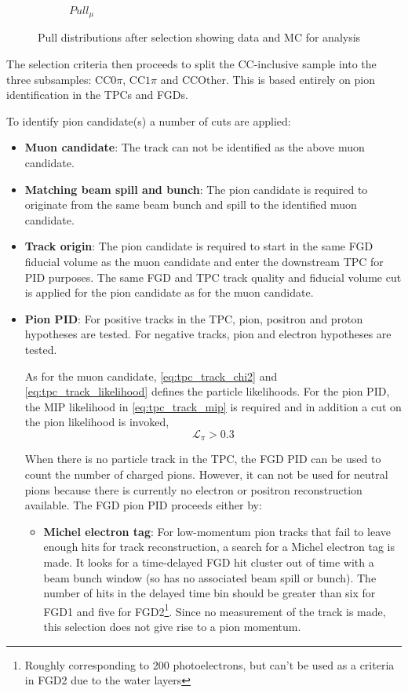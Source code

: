 \begin{figure}[!h]
\begin{subfigure}[t]{0.32\textwidth}
		\caption{$Pull_\mu$}
	\end{subfigure}
	\caption{Pull distributions after selection showing data and MC for \numu analysis}
	\label{fig:numu_pulls}
\end{figure}

The selection criteria then proceeds to split the CC-inclusive sample into the three subsamples: CC$0\pi$, CC$1\pi$ and CCOther. This is based entirely on pion identification in the TPCs and FGDs.

To identify pion candidate(s) a number of cuts are applied:
\begin{itemize}
	\item \textbf{Muon candidate}: The track can not be identified as the above muon candidate.
	
	\item \textbf{Matching beam spill and bunch}: The pion candidate is required to originate from the same beam bunch and spill to the identified muon candidate.
	
	\item \textbf{Track origin}: The pion candidate is required to start in the same FGD fiducial volume as the muon candidate and enter the downstream TPC for PID purposes. The same FGD and TPC track quality and fiducial volume cut is applied for the pion candidate as for the muon candidate.
	
	\item \textbf{Pion PID}: For positive tracks in the TPC, pion, positron and proton hypotheses are tested. For negative tracks, pion and electron hypotheses are tested. 
	
	As for the muon candidate, \autoref{eq:tpc_track_chi2} and \autoref{eq:tpc_track_likelihood} defines the particle likelihoods. For the pion PID, the MIP likelihood in \autoref{eq:tpc_track_mip} is required and in addition a cut on the pion likelihood is invoked,
	\begin{equation}
	\label{tpc_track_pi}
		\mathcal{L}_\pi > 0.3
	\end{equation}
	
	When there is no particle track in the TPC, the FGD PID can be used to count the number of charged pions. However, it can not be used for neutral pions because there is currently no electron or positron reconstruction available. The FGD pion PID proceeds either by:
	\begin{itemize}
		\item \textbf{Michel electron tag}: For low-momentum pion tracks that fail to leave enough hits for track reconstruction, a search for a Michel electron tag is made. It looks for a time-delayed FGD hit cluster out of time with a beam bunch window (so has no associated beam spill or bunch). The number of hits in the delayed time bin should be greater than six for FGD1 and five for FGD2\footnote{Roughly corresponding to 200 photoelectrons, but can't be used as a criteria in FGD2 due to the water layers}. Since no measurement of the track is made, this selection does not give rise to a pion momentum.
		

\end{itemize}
\end{itemize}
